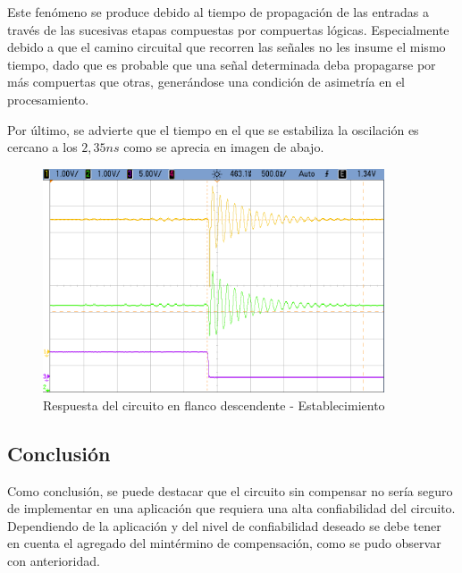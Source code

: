 Este fen\'omeno se produce debido al tiempo de propagaci\'on de las entradas a trav\'es de las sucesivas etapas compuestas por compuertas l\'ogicas. Especialmente debido a que el camino circuital que recorren las se\~nales no les insume el mismo tiempo,  dado que es probable que una se\~nal determinada deba propagarse por m\'as compuertas que otras, gener\'andose una condici\'on de asimetr\'ia en el procesamiento. 

Por \'ultimo, se advierte que el tiempo en el que se estabiliza la oscilaci\'on es cercano a los $2,35ns$ como se aprecia en imagen de abajo.

\begin{figure}[H]
    \centering
    \includegraphics[width=0.9\textwidth]{../EJ3/Recursos/cropped_EJ3_negative_slope_response_zout.png}
	\caption{Respuesta del circuito en flanco descendente - Establecimiento}
   	\label{fig:EJ3_negative_slope_response_zout}
\end{figure}

\subsection{Conclusi\'on}
Como conclusi\'on, se puede destacar que el circuito sin compensar no ser\'ia seguro de implementar en una aplicaci\'on que requiera una alta confiabilidad del circuito. Dependiendo de la aplicaci\'on y del nivel de confiabilidad deseado se debe tener en cuenta el agregado del mint\'ermino de compensaci\'on, como se pudo observar con anterioridad.





